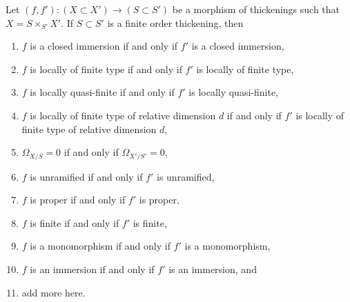 \begin{lemma}
\label{lemma-thicken-property-morphisms-cartesian}
Let $(f, f') : (X \subset X') \to (S \subset S')$ be a morphism
of thickenings such that $X = S \times_{S'} X'$. If $S \subset S'$
is a finite order thickening, then
\begin{enumerate}
\item $f$ is a closed immersion if and only if $f'$ is a closed immersion,
\item $f$ is locally of finite type if and only if $f'$ is
locally of finite type,
\item $f$ is locally quasi-finite if and only if $f'$ is locally
quasi-finite,
\item $f$ is locally of finite type of relative dimension $d$ if and
only if $f'$ is locally of finite type of relative dimension $d$,
\item $\Omega_{X/S} = 0$ if and only if $\Omega_{X'/S'} = 0$,
\item $f$ is unramified if and only if $f'$ is unramified,
\item $f$ is proper if and only if $f'$ is proper,
\item $f$ is finite if and only if $f'$ is finite,
\item $f$ is a monomorphism if and only if $f'$ is a monomorphism,
\item $f$ is an immersion if and only if $f'$ is an immersion, and
\item add more here.
\end{enumerate}
\end{lemma}

